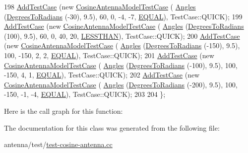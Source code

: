 \begin{DoxyCode}
198   \hyperlink{classns3_1_1TestCase_a3718088e3eefd5d6454569d2e0ddd835}{AddTestCase} (\textcolor{keyword}{new} \hyperlink{classCosineAntennaModelTestCase}{CosineAntennaModelTestCase} (
      \hyperlink{structns3_1_1Angles}{Angles} (\hyperlink{namespacens3_aa3494662745a9a1656f3e6047a6a4062}{DegreesToRadians}  (-30),  9.5),        60,           0,       -4,            
      -7,     \hyperlink{test-cosine-antenna_8cc_ae8bcd1a3938ab2748667be8c74661c05a59a84258a4cb9025b567ee5139455029}{EQUAL}), TestCase::QUICK);
199   \hyperlink{classns3_1_1TestCase_a3718088e3eefd5d6454569d2e0ddd835}{AddTestCase} (\textcolor{keyword}{new} \hyperlink{classCosineAntennaModelTestCase}{CosineAntennaModelTestCase} (
      \hyperlink{structns3_1_1Angles}{Angles} (\hyperlink{namespacens3_aa3494662745a9a1656f3e6047a6a4062}{DegreesToRadians}  (100),  9.5),        60,           0,       40,            
      20,  \hyperlink{test-cosine-antenna_8cc_ae8bcd1a3938ab2748667be8c74661c05a8ce9b27601f653ddc597894a1018c55d}{LESSTHAN}), TestCase::QUICK);
200   \hyperlink{classns3_1_1TestCase_a3718088e3eefd5d6454569d2e0ddd835}{AddTestCase} (\textcolor{keyword}{new} \hyperlink{classCosineAntennaModelTestCase}{CosineAntennaModelTestCase} (
      \hyperlink{structns3_1_1Angles}{Angles} (\hyperlink{namespacens3_aa3494662745a9a1656f3e6047a6a4062}{DegreesToRadians} (-150),  9.5),       100,        -150,        2,            
       2,     \hyperlink{test-cosine-antenna_8cc_ae8bcd1a3938ab2748667be8c74661c05a59a84258a4cb9025b567ee5139455029}{EQUAL}), TestCase::QUICK);
201   \hyperlink{classns3_1_1TestCase_a3718088e3eefd5d6454569d2e0ddd835}{AddTestCase} (\textcolor{keyword}{new} \hyperlink{classCosineAntennaModelTestCase}{CosineAntennaModelTestCase} (
      \hyperlink{structns3_1_1Angles}{Angles} (\hyperlink{namespacens3_aa3494662745a9a1656f3e6047a6a4062}{DegreesToRadians} (-100),  9.5),       100,        -150,        4,            
       1,     \hyperlink{test-cosine-antenna_8cc_ae8bcd1a3938ab2748667be8c74661c05a59a84258a4cb9025b567ee5139455029}{EQUAL}), TestCase::QUICK);
202   \hyperlink{classns3_1_1TestCase_a3718088e3eefd5d6454569d2e0ddd835}{AddTestCase} (\textcolor{keyword}{new} \hyperlink{classCosineAntennaModelTestCase}{CosineAntennaModelTestCase} (
      \hyperlink{structns3_1_1Angles}{Angles} (\hyperlink{namespacens3_aa3494662745a9a1656f3e6047a6a4062}{DegreesToRadians} (-200),  9.5),       100,        -150,       -1,            
      -4,     \hyperlink{test-cosine-antenna_8cc_ae8bcd1a3938ab2748667be8c74661c05a59a84258a4cb9025b567ee5139455029}{EQUAL}), TestCase::QUICK);
203 
204 \};
\end{DoxyCode}


Here is the call graph for this function\+:




The documentation for this class was generated from the following file\+:\begin{DoxyCompactItemize}
\item 
antenna/test/\hyperlink{test-cosine-antenna_8cc}{test-\/cosine-\/antenna.\+cc}\end{DoxyCompactItemize}
